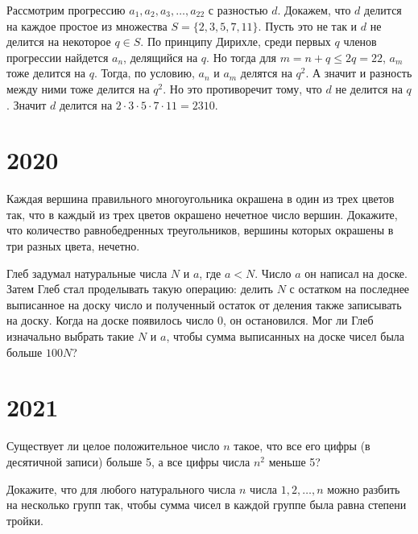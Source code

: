 \documentclass[11pt, a4paper]{common/document_template}
\begin{document}
\begin{Solution}
Рассмотрим прогрессию $a_{1}, a_{2}, a_{3}, \dots, a_{22}$ с разностью $d$. Докажем, что $d$ делится на каждое простое из множества $S = \{2, 3, 5, 7, 11\}$. Пусть это не так и $d$ не делится на некоторое $q \in S$. По принципу Дирихле, среди первых $q$ членов прогрессии найдется $a_{n}$, делящийся на $q$. Но тогда для $m = n + q \leqslant 2q = 22$,  $a_{m}$ тоже делится на $q$. Тогда, по условию, $a_{n}$ и $a_{m}$ делятся на $q^{2}$. А значит и разность между ними тоже делится на $q^{2}$. Но это противоречит тому, что $d$ не делится на $q$. Значит $d$ делится на $2 \cdot 3 \cdot 5 \cdot 7 \cdot 11 = 2310$.
\end{Solution}

\chapter{2020}



\begin{exercise}[2593]
Каждая вершина правильного многоугольника окрашена в один из трех цветов так, что в каждый из трех цветов окрашено нечетное число вершин. Докажите, что количество равнобедренных треугольников, вершины которых окрашены в три разных цвета, нечетно.
\end{exercise}

\begin{exercise}[2601]
Глеб задумал натуральные числа $N$ и $a$, где $a < N$. Число $a$ он написал на доске. Затем Глеб стал проделывать такую операцию: делить $N$ с остатком на последнее выписанное на доску число и полученный остаток от деления также записывать на доску. Когда на доске
появилось число 0, он остановился. Мог ли Глеб изначально выбрать такие $N$ и $a$, чтобы сумма выписанных на доске чисел была больше $100N$?
\end{exercise}

\chapter{2021}

\begin{exercise}[2638]
Существует ли целое положительное число $n$ такое, что все его цифры (в десятичной записи) больше 5, а все цифры числа $n^{2}$ меньше 5?
\end{exercise}

\begin{exercise}[2669]
Докажите, что для любого натурального числа $n$ числа $1, 2, \dots, n$ можно разбить на несколько групп так, чтобы сумма чисел в каждой группе была равна степени тройки.
\end{exercise}
\end{document}
